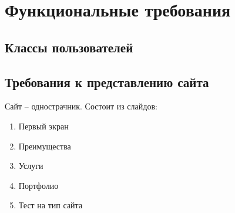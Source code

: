 \section{Функциональные требования}
\subsection{Классы пользователей}

\subsection{Требования к представлению сайта}
Сайт -- однострачник. Состоит из слайдов:
\begin{enumerate}
  \item Первый экран
  \item Преимущества
  \item Услуги
  \item Портфолио
  \item Тест на тип сайта
\end{enumerate}
